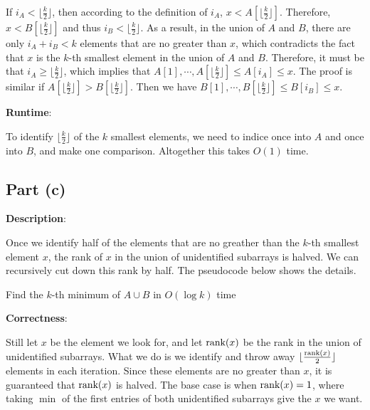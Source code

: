 \documentclass{article}
\begin{document}
If $i_A<\lfloor\frac{k}{2}\rfloor$, then according to the definition of $i_A$, $x<A[\lfloor\frac{k}{2}\rfloor]$. Therefore, $x<B[\lfloor\frac{k}{2}\rfloor]$ and thus $i_B<\lfloor\frac{k}{2}\rfloor$. As a result, in the union of $A$ and $B$, there are only $i_A+i_B<k$ elements that are no greater than $x$, which contradicts the fact that $x$ is the $k$-th smallest element in the union of $A$ and $B$. Therefore, it must be that $i_A\geqslant\lfloor\frac{k}{2}\rfloor$, which implies that $A[1],\cdots,A[\lfloor\frac{k}{2}\rfloor]\leqslant A[i_A]\leqslant x$. The proof is similar if $A[\lfloor\frac{k}{2}\rfloor]>B[\lfloor\frac{k}{2}\rfloor]$. Then we have $B[1],\cdots,B[\lfloor\frac{k}{2}\rfloor]\leqslant B[i_B]\leqslant x$.

\noindent\textbf{Runtime}:

To identify $\lfloor\frac{k}{2}\rfloor$ of the $k$ smallest elements, we need to indice once into $A$ and once into $B$, and make one comparison. Altogether this takes $O(1)$ time.

\subsection{Part (c)}
\noindent\textbf{Description}:

Once we identify half of the elements that are no greather than the $k$-th smallest element $x$, the rank of $x$ in the union of unidentified subarrays is halved. We can recursively cut down this rank by half. The pseudocode below shows the details.
\begin{algorithm}
\caption{Find the $k$-th minimum of $A\cup B$ in $O(\log k)$ time}
\begin{algorithmic}[1]
\Else
	\Else{}
	\EndIf
\EndIf
\EndProcedure
\end{algorithmic}
\end{algorithm}

\noindent\textbf{Correctness}:

Still let $x$ be the element we look for, and let $\textup{rank}(x)$ be the rank in the union of unidentified subarrays. What we do is we identify and throw away $\lfloor\frac{\textup{rank}(x)}{2}\rfloor$ elements in each iteration. Since these elements are no greater than $x$, it is guaranteed that $\textup{rank}(x)$ is halved. The base case is when $\textup{rank}(x)=1$, where taking $\min$ of the first entries of both unidentified subarrays give the $x$ we want.
\end{document}
